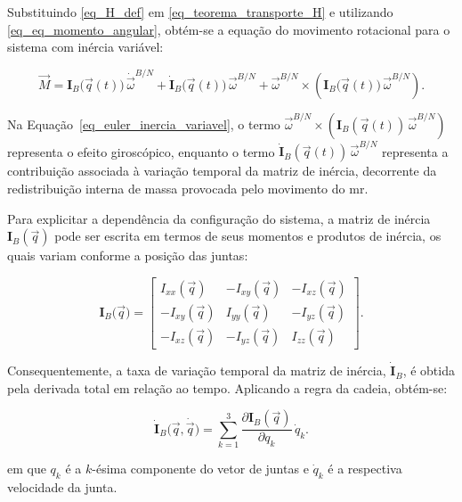 Substituindo \eqref{eq_H_def} em \eqref{eq_teorema_transporte_H} e utilizando \eqref{eq_eq_momento_angular}, obtém-se a equação do movimento rotacional para o sistema com inércia variável:

\begin{equation}
\vec{M}
=
\mathbf{I}_B\big(\vec{q}(t)\big)\,
\dot{\vec{\omega}}^{B/N}
+
\dot{\mathbf{I}}_B\big(\vec{q}(t)\big)\,
\vec{\omega}^{B/N}
+
\vec{\omega}^{B/N} \times
\left(
\mathbf{I}_B\big(\vec{q}(t)\big)\,
\vec{\omega}^{B/N}
\right).
\label{eq_euler_inercia_variavel}
\end{equation}

Na Equação~\eqref{eq_euler_inercia_variavel}, o termo
$\vec{\omega}^{B/N} \times \left(\mathbf{I}_B(\vec{q}(t))\,\vec{\omega}^{B/N}\right)$
representa o efeito giroscópico, enquanto o termo
$\dot{\mathbf{I}}_B(\vec{q}(t))\,\vec{\omega}^{B/N}$
representa a contribuição associada à variação temporal da matriz de inércia, decorrente da redistribuição interna de massa provocada pelo movimento do \gls{mr}.

Para explicitar a dependência da configuração do sistema, a matriz de inércia $\mathbf{I}_B(\vec{q})$ pode ser escrita em termos de seus momentos e produtos de inércia, os quais variam conforme a posição das juntas:

\begin{equation}
\mathbf{I}_B\big(\vec{q}\big)
=
\begin{bmatrix}
I_{xx}(\vec{q}) & -I_{xy}(\vec{q}) & -I_{xz}(\vec{q}) \\
-I_{xy}(\vec{q}) & I_{yy}(\vec{q}) & -I_{yz}(\vec{q}) \\
-I_{xz}(\vec{q}) & -I_{yz}(\vec{q}) & I_{zz}(\vec{q})
\end{bmatrix}.
\label{eq_matriz_inercia_expandida}
\end{equation}

Consequentemente, a taxa de variação temporal da matriz de inércia, $\dot{\mathbf{I}}_B$, é obtida pela derivada total em relação ao tempo. Aplicando a regra da cadeia, obtém-se:

\begin{equation}
\dot{\mathbf{I}}_B\big(\vec{q}, \dot{\vec{q}}\big)
=
\sum_{k=1}^{3}
\frac{\partial \mathbf{I}_B(\vec{q})}{\partial q_k}\,\dot{q}_k.
\label{eq_derivada_inercia_expandida}
\end{equation}

em que $q_k$ é a $k$-ésima componente do vetor de juntas e $\dot{q}_k$ é a respectiva velocidade da junta.